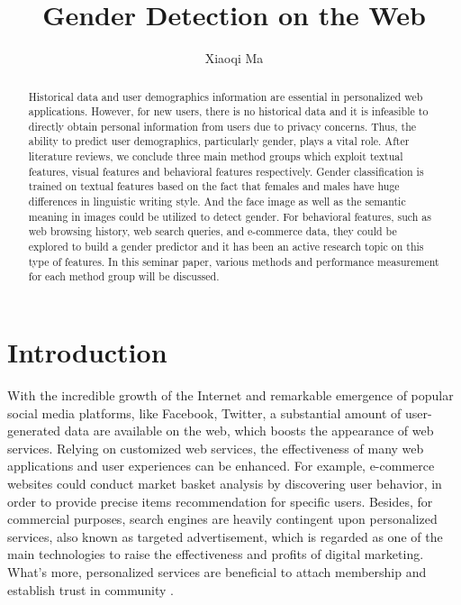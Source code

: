 \documentclass[runningheads]{llncs}
\begin{document}
	
	\title{Gender Detection on the Web}
	\author{Xiaoqi Ma}
	\maketitle  
	
	\begin{abstract}
		
		Historical data and user demographics information are essential in personalized web applications. However, for new users, there is no historical data and it is infeasible to directly obtain personal information from users due to privacy concerns. Thus, the ability to predict user demographics, particularly gender, plays a vital role. After literature reviews, we conclude three main method groups which exploit textual features, visual features and behavioral features respectively. Gender classification is trained on textual features based on the fact that females and males have huge differences in linguistic writing style. And the face image as well as the semantic meaning in images could be utilized to detect gender. For behavioral features, such as web browsing history, web search queries, and e-commerce data, they could be explored to build a gender predictor and it has been an active research topic on this type of features. In this seminar paper, various methods and performance measurement for each method group will be discussed.
		
	\end{abstract}
	
	\section{Introduction}
	
	With the incredible growth of the Internet and remarkable emergence of popular social media platforms, like Facebook, Twitter, a substantial amount of user-generated data are available on the web, which boosts the appearance of web services. Relying on customized web services, the effectiveness of many web applications and user experiences can be enhanced. For example, e-commerce websites could conduct market basket analysis by discovering user behavior, in order to provide precise items recommendation for specific users. Besides, for commercial purposes, search engines are heavily contingent upon personalized services, also known as targeted advertisement, which is regarded as one of the main technologies to raise the effectiveness and profits of digital marketing. What’s more, personalized services are beneficial to attach membership and establish trust in community \cite{zhong2015you}.\\
	
\end{document}
